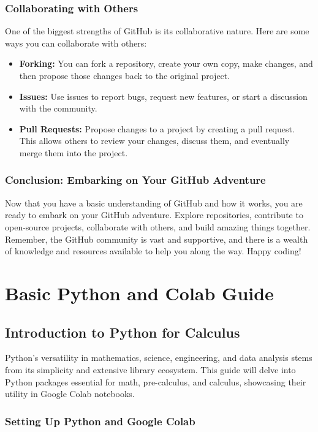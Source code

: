 \documentclass[a4paper,12pt]{book}
\begin{document}
\subsection*{Collaborating with Others}

One of the biggest strengths of GitHub is its collaborative nature. Here are some ways you can collaborate with others:

\begin{itemize}
    \item \textbf{Forking:} You can fork a repository, create your own copy, make changes, and then propose those changes back to the original project.
    \item \textbf{Issues:} Use issues to report bugs, request new features, or start a discussion with the community.
    \item \textbf{Pull Requests:} Propose changes to a project by creating a pull request. This allows others to review your changes, discuss them, and eventually merge them into the project.
\end{itemize}

\subsection*{Conclusion: Embarking on Your GitHub Adventure}

Now that you have a basic understanding of GitHub and how it works, you are ready to embark on your GitHub adventure. Explore repositories, contribute to open-source projects, collaborate with others, and build amazing things together. Remember, the GitHub community is vast and supportive, and there is a wealth of knowledge and resources available to help you along the way. Happy coding!

\chapter{Basic Python and Colab Guide}
\section*{Introduction to Python for Calculus}

Python's versatility in mathematics, science, engineering, and data analysis stems from its simplicity and extensive library ecosystem. This guide will delve into Python packages essential for math, pre-calculus, and calculus, showcasing their utility in Google Colab notebooks.

\subsection*{Setting Up Python and Google Colab}
\end{document}
